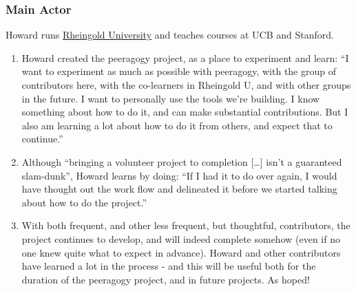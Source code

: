 \subsubsection{Main Actor}

Howard runs \href{http://www.rheingold.com/university/}{Rheingold
University} and teaches courses at UCB and Stanford.

\begin{enumerate}
\item
  Howard created the peeragogy project, as a place to experiment and
  learn: ``I want to experiment as much as possible with peeragogy, with
  the group of contributors here, with the co-learners in Rheingold U,
  and with other groups in the future. I want to personally use the
  tools we're building. I know something about how to do it, and can
  make substantial contributions. But I also am learning a lot about how
  to do it from others, and expect that to continue.''
\item
  Although ``bringing a volunteer project to completion {[}\ldots{}{]}
  isn't a guaranteed slam-dunk'', Howard learns by doing: ``If I had it
  to do over again, I would have thought out the work flow and
  delineated it before we started talking about how to do the project.''
\item
  With both frequent, and other less frequent, but thoughtful,
  contributors, the project continues to develop, and will indeed
  complete somehow (even if no one knew quite what to expect in
  advance). Howard and other contributors have learned a lot in the
  process - and this will be useful both for the duration of the
  peeragogy project, and in future projects. As hoped!
\end{enumerate}
